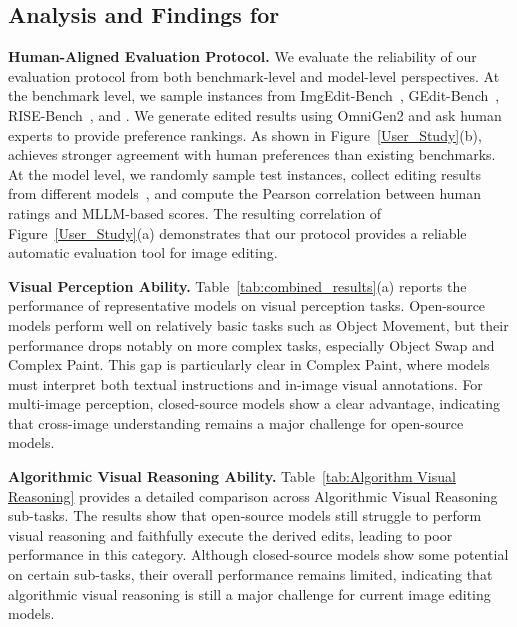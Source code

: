 \begin{table}[t]
\vspace{-1em}
\end{table}





\subsection{Analysis and Findings for {\bench}}

\textbf{Human-Aligned Evaluation Protocol.}
We evaluate the reliability of our evaluation protocol from both benchmark-level and model-level perspectives. At the benchmark level, we sample instances from ImgEdit-Bench~\cite{ye2025imgedit}, GEdit-Bench~\cite{liu2025step1x}, RISE-Bench~\cite{zhao2025envisioning}, and {\bench}. We generate edited results using OmniGen2 and ask human experts to provide preference rankings. As shown in Figure~\ref{User_Study}(b), {\bench} achieves stronger agreement with human preferences than existing benchmarks.
At the model level, we randomly sample test instances, collect editing results from different models~\cite{wu2025qwen,flux-2-2025,nanobananapro,deng2025emerging}, and compute the Pearson correlation between human ratings and MLLM-based scores. The resulting correlation of Figure~\ref{User_Study}(a) demonstrates that our protocol provides a reliable automatic evaluation tool for image editing.



\textbf{Visual Perception Ability.}
Table~\ref{tab:combined_results}(a) reports the performance of representative models on visual perception tasks. Open-source models perform well on relatively basic tasks such as Object Movement, but their performance drops notably on more complex tasks, especially Object Swap and Complex Paint. This gap is particularly clear in Complex Paint, where models must interpret both textual instructions and in-image visual annotations. For multi-image perception, closed-source models show a clear advantage, indicating that cross-image understanding remains a major challenge for open-source models.

\textbf{Algorithmic Visual Reasoning Ability.}
Table~\ref{tab:Algorithm Visual Reasoning} provides a detailed comparison across Algorithmic Visual Reasoning sub-tasks. The results show that open-source models still struggle to perform visual reasoning and faithfully execute the derived edits, leading to poor performance in this category. Although closed-source models show some potential on certain sub-tasks, their overall performance remains limited, indicating that algorithmic visual reasoning is still a major challenge for current image editing models.

